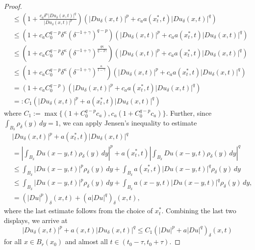 \documentclass[notitlepage,11pt,reqno]{amsart}
\theoremstyle{definition}
\numberwithin{equation}{section}
\begin{document}
\begin{proof}
\begin{align*}
 & \leq\left(1+\frac{c_a \delta^{\kappa} \left|Du_{\delta}(x,t)\right|^{q}}{\left|Du_{\delta}(x,t)\right|^{p}}\right)\left(\left|Du_{\delta}(x,t)\right|^{p}+c_a a(x_{t}^{\ast},t)\left|Du_{\delta}(x,t)\right|^{q}\right)\nonumber \\
 & \leq\left(1+c_a C^{q-p}_0\delta^{\kappa}\left(\delta^{-1+\gamma}\right)^{q-p}\right)\left(\left|Du_{\delta}(x,t)\right|^{p}+c_a a(x_{t}^{\ast},t)\left|Du_{\delta}(x,t)\right|^{q}\right)\nonumber \\
 &\leq \left(1+c_a C^{q-p}_0 \delta^{\kappa}\left(\delta^{-1+\gamma}\right)^{\frac{q\kappa}{q-2\gamma}}\right)\left(\left|Du_{\delta}(x,t)\right|^{p}+c_a a(x_{t}^{\ast},t)\left|Du_{\delta}(x,t)\right|^{q}\right)\nonumber \\
 &\leq \left(1+c_a C^{q-p}_0 \delta^{\kappa}\left(\delta^{-1+\gamma}\right)^{\frac{\kappa}{1-\gamma}}\right)\left(\left|Du_{\delta}(x,t)\right|^{p}+c_a a(x_{t}^{\ast},t)\left|Du_{\delta}(x,t)\right|^{q}\right)\nonumber \\
 & =\left(1+c_a C^{q-p}_0\right)\left(\left|Du_{\delta}(x,t)\right|^{p}+c_a a(x_{t}^{\ast},t)\left|Du_{\delta}(x,t)\right|^{q}\right)\nonumber \\
 & =:C_{1}\left(\left|Du_{\delta}(x,t)\right|^{p}+a(x_{t}^{\ast},t)\left|Du_{\delta}(x,t)\right|^{q}\right)
\end{align*}
where $C_1:=\max\{(1+C^{q-p}_0 c_a), c_a(1+C^{q-p}_0 c_a)\}.$
Further, since $\int_{B_{\delta}}\rho_{\delta}(y)\, dy=1$, we can apply Jensen's inequality to estimate
\begin{align*}
 & \left|Du_{\delta}(x,t)\right|^{p}+a(x_{t}^{\ast},t)\left|Du_{\delta}(x,t)\right|^{q}\\
 & =\left|\int_{B_{\delta}}Du(x-y,t)\rho_{\delta}(y)\, d y\right|^{p}+a(x_{t}^{\ast},t)\left|\int_{B_{\delta}}Du\left(x-y,t\right)\rho_{\delta}(y)\, d y\right|^{q}\\
 & \leq\int_{B_{\delta}}\left|Du(x-y,t)\right|^{p}\rho_{\delta}(y)\, dy+\int_{B_{\delta}}a(x_{t}^{\ast},t)\left|Du\left(x-y,t\right)\right|^{q}\rho_{\delta}(y)\, dy\\
 & \leq\int_{B_{\delta}}\left|Du(x-y,t)\right|^{p}\rho_{\delta}(y)\, d y+\int_{B_{\delta}}a(x-y,t)\left|Du\left(x-y,t\right)\right|^{q}\rho_{\delta}(y)\, d y,\\
 & =(\left|Du\right|^{p})_{\delta}(x,t)+(a\left|Du\right|^{q})_{\delta}(x,t),
\end{align*}
where the last estimate follows from the choice of $x_{t}^{\ast}$. Combining the last two displays, we arrive at
\begin{equation}
\left|Du_{\delta}(x,t)\right|^{p}+a(x,t)\left|Du_{\delta}(x,t)\right|^{q}\leq C_{1}(\left|Du\right|^{p}+a\left|Du\right|^{q})_{\delta}(x,t)\label{eq:space approx 4-1}
\end{equation}
for all $x\in B_{r}(x_0)$ and almost all $t\in(t_0-\tau, t_0+\tau)$.


\end{proof}
\end{document}
